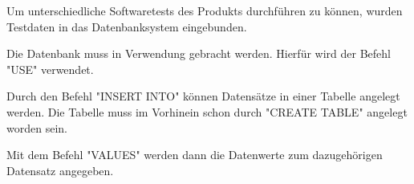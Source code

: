 
Um unterschiedliche Softwaretests des Produkts durchführen zu können, wurden Testdaten in das Datenbanksystem eingebunden.


Die Datenbank muss in Verwendung gebracht werden. Hierfür wird der Befehl "USE" verwendet.


Durch den Befehl "INSERT INTO" können Datensätze in einer Tabelle angelegt werden. Die Tabelle muss im Vorhinein schon durch "CREATE TABLE" angelegt worden sein.


Mit dem Befehl "VALUES" werden dann die Datenwerte zum dazugehörigen Datensatz angegeben.

